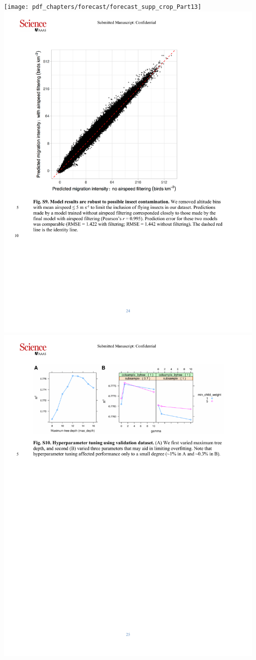 \documentclass[a4paper, twoside]{templates/ociamthesis}
\begin{document}
\texttt{[image: pdf\_chapters/forecast/forecast\_supp\_crop\_Part13]}
\includegraphics[width=1\linewidth]{pdf_chapters/forecast/forecast_supp_crop_Part14}
\includegraphics[width=1\linewidth]{pdf_chapters/forecast/forecast_supp_crop_Part15}
\end{document}
